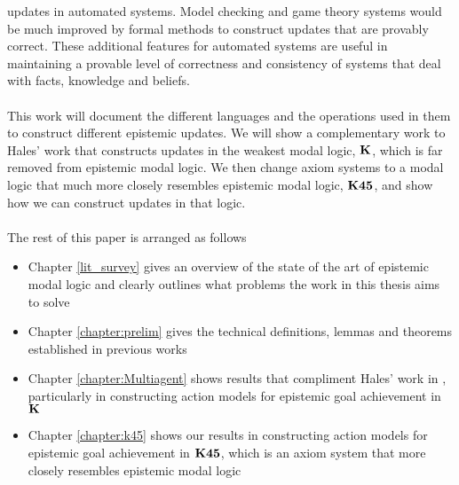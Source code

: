 updates in automated systems.
Model checking and game theory systems would be much improved by formal methods
to construct updates that are provably correct.
These additional features for automated systems are useful in maintaining
a provable level of correctness and consistency of systems that deal with facts, knowledge and
beliefs.\\
\\
This work will document the different languages and the operations used in them to construct
different epistemic updates.
We will show a complementary work to Hales' work that constructs updates in the weakest modal logic,
$\bf K$, which is far removed from epistemic modal logic.
We then change axiom systems to a modal logic that much more closely resembles epistemic modal
logic, $\bf K45$, and show how we can construct updates in that logic.\\
\\
The rest of this paper is arranged as follows
\begin{itemize}
	\item Chapter \ref{lit_survey} gives an overview of the state of the art of epistemic modal logic
		and clearly outlines what problems the work in this thesis aims to solve
	\item Chapter \ref{chapter:prelim} gives the technical definitions, lemmas and theorems
		established in previous works
	\item Chapter \ref{chapter:Multiagent} shows results that compliment Hales' work in
		\cite{hales13synthesis}, particularly in constructing action models for epistemic goal
		achievement in $\bf K$
	\item Chapter \ref{chapter:k45} shows our results in constructing action models for epistemic goal
		achievement in $\bf K45$, which is an axiom system that more closely resembles epistemic modal
		logic
\end{itemize}
